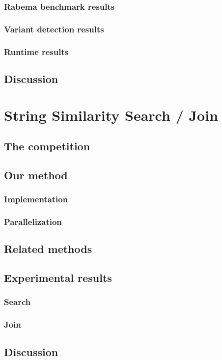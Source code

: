 \subsection{Rabema benchmark results}
\subsection{Variant detection results}
\subsection{Runtime results}
\section{Discussion}

\chapter{String Similarity Search / Join}
\section{The competition}
\section{Our method}
\subsection{Implementation}
\subsection{Parallelization}
\section{Related methods}
\section{Experimental results}
\subsection{Search}
\subsection{Join}
\section{Discussion}


